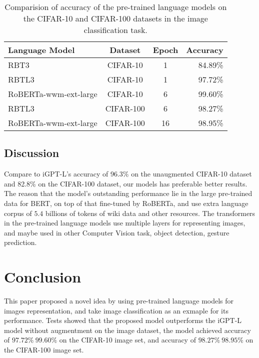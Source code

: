 \documentclass[review]{cvpr}
\begin{document}
\begin{table}
\begin{center}
\begin{tabular}{|l|c|c|r|}
\hline
Language Model 	& Dataset & Epoch & Accuracy \\
\hline\hline
RBT3   & CIFAR-10 & 1	&	84.89\% \\
RBTL3  & CIFAR-10 & 1	&	97.72\% \\
RoBERTa-wwm-ext-large  & CIFAR-10 & 6	&	99.60\% \\
RBTL3  & CIFAR-100 & 6  & 	98.27\% \\
RoBERTa-wwm-ext-large & CIFAR-100 & 16 &	98.95\% \\
\hline
\end{tabular}
\end{center}
\caption{Comparision of accuracy of the pre-trained language models on the CIFAR-10 and CIFAR-100 datasets in the image classification task.}
\end{table}


\subsection{Discussion}

 Compare to iGPT-L's accuracy of 96.3\% on the unaugmented CIFAR-10 dataset and 82.8\% on the CIFAR-100 dataset, our models has preferable better results.
The reason that the model's outstanding performance lie in the large pre-trained data for BERT, on top of that fine-tuned by RoBERTa, and use extra language corpus of
$5.4$ billions of tokens of wiki data and other resources.
The transformers in the pre-trained language models use multiple layers for representing images, and maybe used in other Computer Vision task, \eg object detection, gesture prediction.


\section{Conclusion}

This paper proposed a novel idea by using pre-trained language models for images representation, and take image classification as an exmaple for its performance.
Tests showed that the proposed model outperforms the iGPT-L model without augmentment on the image dataset,
the model achieved accuracy of $97.72\%~99.60\%$ on the CIFAR-10 image set,
and accuracy of $98.27\%~98.95\%$ on the CIFAR-100 image set.


{\small


}
\end{document}
